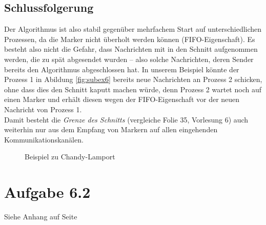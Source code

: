 \documentclass[a4paper,
12pt,
BCOR12mm,
]{scrartcl}
\theoremstyle{break}
\begin{document}
\subsection*{Schlussfolgerung}
Der Algorithmus ist also stabil gegenüber mehrfachem Start auf unterschiedlichen
Prozessen, da die Marker nicht überholt werden können (FIFO-Eigenschaft). Es besteht also
nicht die Gefahr, dass Nachrichten mit in den Schnitt aufgenommen werden, die zu spät
abgesendet wurden -- also solche Nachrichten, deren Sender bereits den Algorithmus
abgeschlossen hat. In unserem Beispiel könnte der Prozess 1 in Abildung \ref{fig:subex6} bereits neue Nachrichten an
Prozess 2 schicken, ohne dass dies den Schnitt kaputt machen würde, denn Prozess 2 wartet
noch auf einen Marker und erhält diesen wegen der FIFO-Eigenschaft vor der neuen Nachricht
von Prozess 1. \\
Damit besteht die \emph{Grenze des Schnitts} (vergleiche Folie 35, Vorlesung 6) auch
weiterhin nur aus dem Empfang von Markern auf allen eingehenden Kommunikationskanälen.

\begin{figure}[ht!]
  \begin{center}
  \end{center}
  \caption{Beispiel zu Chandy-Lamport}
  \label{fig:example}
\end{figure}

\section*{Aufgabe 6.2}
Siehe Anhang auf Seite \pageref{Anhang}
\end{document}
